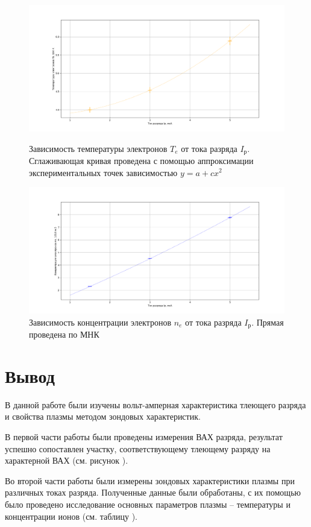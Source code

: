 \documentclass[a4paper,10pt]{article}
\begin{document}
\begin{figure}[h]
	\centering
	\includegraphics[scale=0.3]{temp}
	\caption{Зависимость температуры электронов $T_e$ от тока разряда $I_{\text{р}}$. Сглаживающая кривая проведена с помощью аппроксимации экспериментальных точек зависимостью $y=a+cx^2$} \label{temp}
	\centering
	\includegraphics[scale=0.30]{conc}
	\caption{Зависимость концентрации электронов $n_e$ от тока разряда $I_{\text{р}}$. Прямая проведена по МНК} \label{conc}
\end{figure}

\section*{Вывод}

В данной работе были изучены вольт-амперная характеристика тлеющего разряда и свойства плазмы методом зондовых характеристик.

В первой части работы были проведены измерения ВАХ разряда, результат успешно сопоставлен участку, соответствующему тлеющему разряду на характерной ВАХ (см. рисунок ).

Во второй части работы были измерены зондовых характеристики плазмы при различных токах разряда. Полученные данные были обработаны, с их помощью было проведено исследование основных параметров плазмы -- температуры и концентрации ионов (см. таблицу ).
\end{document}
